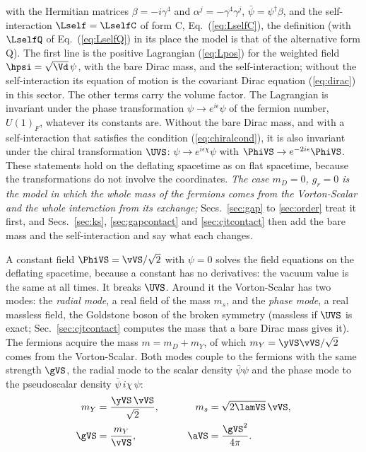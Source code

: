 with the Hermitian matrices $\beta=-i\gamma^{4}$ and $\alpha^{j}=-\gamma^{4}\gamma^{j}$,
$\bar\psi=\psi^\dagger\beta$, and the self-interaction $\Lself=\LselfC$ of form C,
Eq.~(\ref{eq:LselfC}), the definition (with $\LselfQ$ of Eq.~(\ref{eq:LselfQ}) in its place the model
is that of the alternative form Q). The first line is the positive Lagrangian (\ref{eq:Lpos}) for the weighted field
$\hpsi=\sqrt{\Vd}\,\psi$, with the bare Dirac mass, and the self-interaction; without the
self-interaction its equation of motion is the covariant Dirac equation (\ref{eq:dirac}) in this
sector. The other terms carry the volume factor.
The Lagrangian is invariant under the phase transformation $\psi\to e^{i\epsilon}\psi$ of the
fermion number, $U(1)_F$, whatever its constants are. Without the bare Dirac mass, and with a
self-interaction that satisfies the condition (\ref{eq:chiralcond}), it is also invariant under the
chiral transformation $\UVS$: $\psi\to e^{i\epsilon\chi}\psi$ with
$\PhiVS\to e^{-2i\epsilon}\PhiVS$. These statements hold on the deflating spacetime as on flat
spacetime, because the transformations do not involve the coordinates. \emph{The case $m_D=0$,
$g_r=0$ is the model in which the whole mass of the fermions comes from the Vorton-Scalar and the
whole interaction from its exchange;} Secs.~\ref{sec:gap} to \ref{sec:order} treat it first, and
Secs.~\ref{sec:ks}, \ref{sec:gapcontact} and \ref{sec:cjtcontact} then add the bare mass and the
self-interaction and say what each changes.

A constant field $\PhiVS=\vVS/\sqrt2$ with $\psi=0$ solves the field equations on the deflating
spacetime, because a constant has no derivatives: the vacuum value is the same at all times. It
breaks $\UVS$. Around it the Vorton-Scalar has two modes: the \emph{radial mode}, a real field of the
mass $m_s$, and the \emph{phase mode}, a real massless field, the Goldstone boson of the broken
symmetry (massless if $\UVS$ is exact; Sec.~\ref{sec:cjtcontact} computes the mass that a bare Dirac
mass gives it). The fermions acquire the mass $m=m_D+m_Y$, of which $m_Y=\yVS\vVS/\sqrt2$ comes from
the Vorton-Scalar. Both modes couple to the fermions with the same strength
$\gVS$, the radial mode to the scalar density $\bar\psi\psi$ and the phase mode to the pseudoscalar
density $\bar\psi\,i\chi\,\psi$:
\begin{equation}
\begin{aligned}
m_Y&=\frac{\yVS\,\vVS}{\sqrt2},&\qquad m_s&=\sqrt{2\lamVS}\,\vVS,\\
\gVS&=\frac{m_Y}{\vVS},&\qquad\aVS&=\frac{\gVS^{2}}{4\pi}.
\end{aligned}
\label{eq:masses}
\end{equation}

